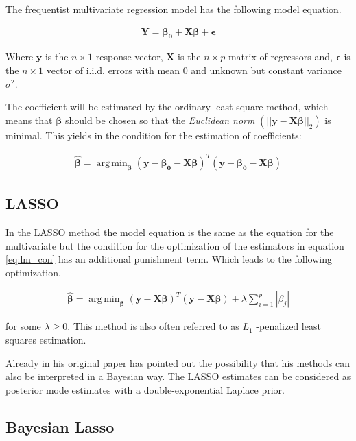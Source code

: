 \documentclass[12pt,a4paper]{article}
\DeclareMathOperator*{\argmin}{arg\,min}
\begin{document}
The frequentist multivariate regression model has the following model
equation.

\begin{align}
\label{eq:lm}
\pmb{Y = \beta_0 + X \beta} + \pmb{\epsilon}
\end{align}

Where \(\pmb{y}\) is the \(n \times 1\) response vector, \(\pmb{X}\) is
the \(n \times p\) matrix of regressors and, \(\pmb{\epsilon}\) is the
\(n \times 1\) vector of \ac{i.i.d.} errors with mean 0 and unknown but
constant variance \(\sigma^2\).

The coefficient will be estimated by the ordinary least square method,
which means that \(\pmb{\beta}\) should be chosen so that the
\emph{Euclidean norm} \(\left( || \mathbf{y - X\beta} ||_2 \right)\) is
minimal. This yields in the condition for the estimation of
coefficients:

\begin{align}
\label{eq:lm_con}
 \hat{\pmb{\beta}} = \argmin_{ \pmb{\beta}} (\pmb{y - \beta_0 - X  \beta})^T (\pmb{y - \beta_0 - X  \beta})
\end{align}

\hypertarget{section}{%
\subsection{\texorpdfstring{\acf{LASSO}}{}}\label{section}}

In the \ac{LASSO} method the model equation is the same as the equation
for the multivariate but the condition for the optimization of the
estimators in equation \eqref{eq:lm_con} has an additional punishment
term. Which leads to the following optimization.

\begin{align}
\label{eq:la_con}
\hat{\pmb{\beta}} = \argmin_{\pmb{\beta}}  \left( \pmb{y - X \beta} \right)^T \left( \pmb{y - X \beta} \right) + \lambda \sum_{i = 1}^{p} |\beta_j|
\end{align}

for some \(\lambda \geq 0\). This method is also often referred to as
\(L_1\) -penalized least squares estimation.

Already in his original paper \textcite{tibshirani_regression_1996} has
pointed out the possibility that his methods can also be interpreted in
a Bayesian way. The LASSO estimates can be considered as posterior mode
estimates with a double-exponential Laplace prior.

\hypertarget{bayesian-lasso}{%
\subsection{Bayesian Lasso}\label{bayesian-lasso}}
\end{document}
